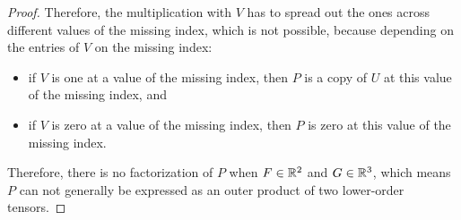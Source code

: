 \begin{proof}
    Therefore, the multiplication with $V$ has to spread out the ones across different values of the missing index,
    which is not possible, because depending on the entries of $V$ on the missing index:
    \begin{itemize}
        \item if $V$ is one at a value of the missing index, then $P$ is a copy of $U$ at this value of the missing index, and
        \item if $V$ is zero at a value of the missing index, then $P$ is zero at this value of the missing index.
    \end{itemize}

    Therefore, there is no factorization of $P$ when $F \in \mathbb{R}^2$ and $G \in \mathbb{R}^3$,
    which means $P$ can not generally be expressed as an outer product of two lower-order tensors.
\end{proof}